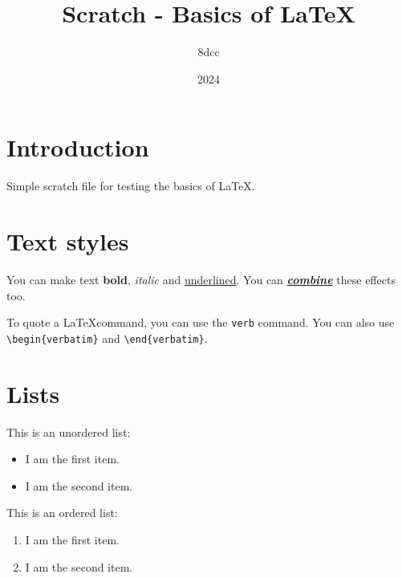 \documentclass{article}
\title{Scratch - Basics of \LaTeX}
\author{8dcc}
\date{2024}
\begin{document}
\maketitle
\newpage

\tableofcontents
\newpage

\section{Introduction}

Simple scratch file for testing the basics of \LaTeX.

\section{Text styles}

You can make text \textbf{bold}, \textit{italic} and \underline{underlined}.
You can \underline{\textbf{\textit{combine}}} these effects too.

To quote a \LaTeX command, you can use the \verb|verb| command. You can also use
\verb|\begin{verbatim}| and \verb|\end{verbatim}|.

\section{Lists}

This is an unordered list:

\begin{itemize}
  \item I am the first item.
  \item I am the second item.
\end{itemize}

This is an ordered list:

\begin{enumerate}
  \item I am the first item.
  \item I am the second item.
\end{enumerate}
\end{document}
